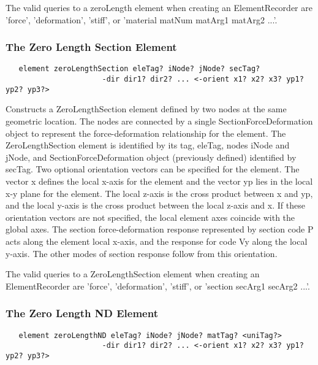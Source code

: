 \documentclass[12pt]{article}
\begin{document}
The valid queries to a zeroLength element when creating an ElementRecorder
are 'force', 'deformation', 'stiff', or 'material matNum matArg1 matArg2 ...'.

\subsubsection{The Zero Length Section Element}
{\sf\small
\begin{verbatim}
   element zeroLengthSection eleTag? iNode? jNode? secTag?
                      -dir dir1? dir2? ... <-orient x1? x2? x3? yp1? yp2? yp3?>
\end{verbatim}
}

\noindent Constructs a ZeroLengthSection element defined by two nodes at the
same geometric location. The nodes are connected by a single
SectionForceDeformation object to represent the force-deformation
relationship for the element. The ZeroLengthSection element is identified
by its tag, eleTag, nodes iNode and jNode, and SectionForceDeformation object
(previously defined) identified by secTag. Two optional orientation vectors can be
specified for the element. The vector x defines the local x-axis for
the element and the vector yp lies in the local x-y plane for the
element. The local z-axis is the cross product between x and yp, and
the local y-axis is the cross product between the local z-axis and x.
If these orientation vectors are not specified, the local element axes
coincide with the global axes. The section force-deformation response
represented by section code P acts along the element local x-axis, and
the response for code Vy along the local y-axis. The other modes of
section response follow from this orientation.

The valid queries to a ZeroLengthSection element when creating an ElementRecorder
are 'force', 'deformation', 'stiff', or 'section secArg1 secArg2 ...'.

\subsubsection{The Zero Length ND Element}
{\sf\small
\begin{verbatim}
   element zeroLengthND eleTag? iNode? jNode? matTag? <uniTag?>
                      -dir dir1? dir2? ... <-orient x1? x2? x3? yp1? yp2? yp3?>
\end{verbatim}
}
\end{document}

